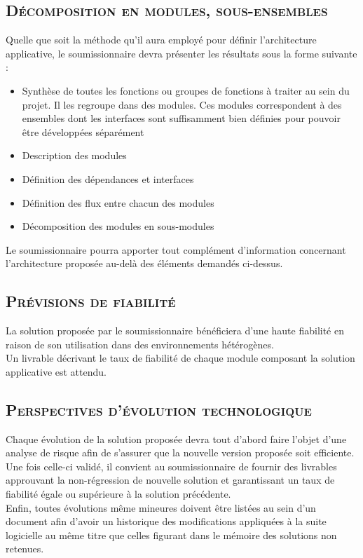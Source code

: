 \subsection{\textsc{Décomposition en modules, sous-ensembles}}
Quelle que soit la méthode qu'il aura employé pour définir l'architecture applicative, le soumissionnaire devra présenter les résultats sous la forme suivante :
\begin{itemize}[label=\textbullet]
 \item Synthèse de toutes les fonctions ou groupes de fonctions à traiter au sein du projet. Il les regroupe dans des modules. Ces modules correspondent à des ensembles dont les interfaces sont suffisamment bien définies pour pouvoir être développées séparément
 \item Description des modules
 \item Définition des dépendances et interfaces
 \item Définition des flux entre chacun des modules
 \item Décomposition des modules en sous-modules
\end{itemize}
Le soumissionnaire pourra apporter tout complément d'information concernant l'architecture proposée au-delà des éléments demandés ci-dessus. 

\subsection{\textsc{Prévisions de fiabilité}}
La solution proposée par le soumissionnaire bénéficiera d'une haute fiabilité en raison de son utilisation dans des environnements hétérogènes.
\\
Un livrable décrivant le taux de fiabilité de chaque module composant la solution applicative est attendu.

\subsection{\textsc{Perspectives d'évolution technologique}}
Chaque évolution de la solution proposée devra tout d'abord faire l'objet d'une analyse de risque afin de s'assurer que la nouvelle version proposée soit efficiente.
\\
Une fois celle-ci validé, il convient au soumissionnaire de fournir des livrables approuvant la non-régression de nouvelle solution et garantissant un taux de fiabilité égale ou supérieure à la solution précédente.
\\
Enfin, toutes évolutions même mineures doivent être listées au sein d'un document afin d'avoir un historique des modifications appliquées à la suite logicielle au même titre que celles figurant dans le mémoire des solutions non retenues.

